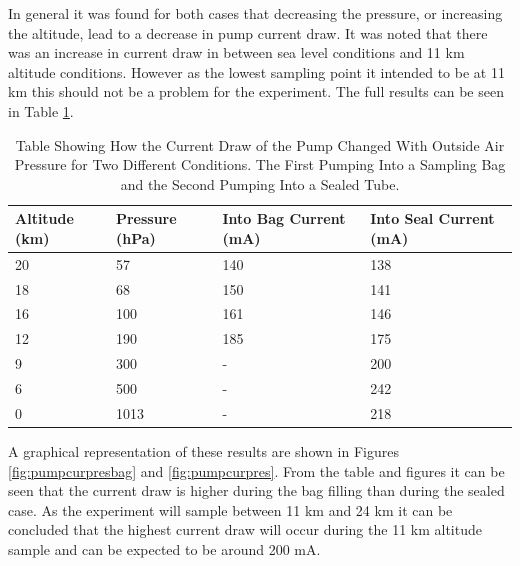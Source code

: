\documentclass[a4paper,12pt,twoside]{article}
\begin{document}
\begin{appendices}
In general it was found for both cases that decreasing the pressure, or increasing the altitude, lead to a decrease in pump current draw. It was noted that there was an increase in current draw in between sea level conditions and 11 km altitude conditions. However as the lowest sampling point it intended to be at 11 km this should not be a problem for the experiment. The full results can be seen in Table \ref{tab:pumpcurrentpressure}. 

\begin{table}[H]
\centering

\begin{tabular}{|l|l|l|l|}
\hline
\textbf{Altitude (km)} & \textbf{Pressure (hPa)} & \textbf{Into Bag Current (mA)} & \textbf{Into Seal Current (mA)} \\ \hline
20 & 57 & 140 & 138 \\ \hline
18 & 68 & 150 & 141 \\ \hline
16 & 100 & 161 & 146 \\ \hline
12 & 190 & 185 & 175 \\ \hline
9 & 300 & - & 200 \\ \hline
6 & 500 & - & 242 \\ \hline
0 & 1013 & - & 218 \\ \hline
\end{tabular}
\caption{Table Showing How the Current Draw of the Pump Changed With Outside Air Pressure for Two Different Conditions. The First Pumping Into a Sampling Bag and the Second Pumping Into a Sealed Tube.}
\label{tab:pumpcurrentpressure}
\end{table}

A graphical representation of these results are shown in Figures \ref{fig:pumpcurpresbag} and \ref{fig:pumpcurpres}. From the table and figures it can be seen that the current draw is higher during the bag filling than during the sealed case. As the experiment will sample between 11 km and 24 km it can be concluded that the highest current draw will occur during the 11 km altitude sample and can be expected to be around 200 mA. 


\end{appendices}
\end{document}
